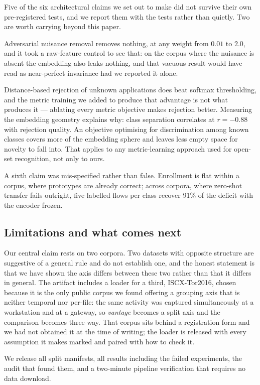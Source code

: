Five of the six architectural claims we set out to make did not survive their
own pre-registered tests, and we report them with the tests rather than
quietly. Two are worth carrying beyond this paper.

Adversarial nuisance removal removes nothing, at any weight from $0.01$ to
$2.0$, and it took a raw-feature control to see that: on the corpus where the
nuisance is absent the embedding also leaks nothing, and that vacuous result
would have read as near-perfect invariance had we reported it alone.

Distance-based rejection of unknown applications does beat softmax
thresholding, and the metric training we added to produce that advantage is not
what produces it --- ablating every metric objective makes rejection better.
Measuring the embedding geometry explains why: class separation correlates at
$r = -0.88$ with rejection quality. An objective optimising for discrimination
among known classes covers more of the embedding sphere and leaves less empty
space for novelty to fall into. That applies to any metric-learning approach
used for open-set recognition, not only to ours.

A sixth claim was mis-specified rather than false. Enrollment is flat within a
corpus, where prototypes are already correct; across corpora, where zero-shot
transfer fails outright, five labelled flows per class recover 91\% of the
deficit with the encoder frozen.

\subsection*{Limitations and what comes next}

Our central claim rests on two corpora. Two datasets with opposite structure
are suggestive of a general rule and do not establish one, and the honest
statement is that we have shown the axis differs between these two rather than
that it differs in general. The artifact includes a loader for a third,
ISCX-Tor2016, chosen because it is the only public corpus we found offering a
grouping axis that is neither temporal nor per-file: the same activity was
captured simultaneously at a workstation and at a gateway, so \emph{vantage}
becomes a split axis and the comparison becomes three-way. That corpus sits
behind a registration form and we had not obtained it at the time of writing;
the loader is released with every assumption it makes marked and paired with
how to check it.

We release all split manifests, all results including the failed experiments,
the audit that found them, and a two-minute pipeline verification that requires
no data download.
